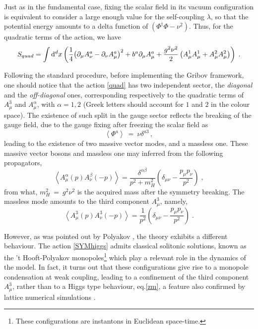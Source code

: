 Just as in the fundamental case, fixing the scalar field in its vacuum configuration is
equivalent to consider a large enough value for the self-coupling $\lambda$, so that the
potential energy amounts to a delta function of $\left(\Phi ^{\dagger}\Phi-\nu ^{2}\right)$.
Thus, for the quadratic terms of the action, we have
\begin{equation}
S_{quad}=\int \mathrm{d}^{d}x\left( \frac{1}{4} { \left(  \partial_\mu A^a_\nu -\partial_\nu A^a_\mu  \right)} ^2 + b^a \partial_\mu A^a_\mu
+ \frac{g^{2}\nu ^{2}}{2}\left( A_{\mu }^{1}A_{\mu }^{1}+A_{\mu }^{2}A_{\mu
}^{2}\right)  \right)  \;. 
\label{quad}
\end{equation}


Following the standard procedure, before implementing the Gribov framework, one should notice
that the action \eqref{quad} has two independent sector, the \emph{diagonal} and the
\emph{off-diagonal} ones, corresponding respectively to the quadratic terms of $A_{\mu}^{3}$
and $A_{\mu}^{\alpha}$, with $\alpha=1,2$ (Greek letters should account for $1$ and $2$ in the
colour space). The existence of such split in the gauge sector reflects the breaking of the
gauge field, due to the gauge fixing after freezing the scalar field as 
\[
\left\langle \Phi^{a}\right\rangle ~=~ \nu \delta ^{a3}\,,
\]
leading to the existence of two massive vector modes, and a massless one. These massive vector
bosons and massless one may inferred from the following propagators,
\begin{equation}
\label{gluonoff}
\left\langle A_{\mu }^{\alpha }(p)A_{\nu }^{\beta }(-p)\right\rangle =\frac{\delta ^{\alpha \beta }}{p^{2}+m_{H}^{2}}\left( \delta _{\mu \nu }-%
\frac{p_{\mu }p_{\nu }}{p^{2}}\right) \;,
\end{equation}
from what, $m_{H}^{2} ~=~ g^{2}\nu ^{2}$ is the acquired mass after the symmetry breaking. The
massless mode amounts to the third component $A_\mu^3$, namely,
\begin{equation}
\left\langle A_{\mu }^{3}(p)A_{\nu }^{3}(-p)\right\rangle =\frac{1}{p^{2}}%
\left( \delta _{\mu \nu }-\frac{p_{\mu }p_{\nu }}{p^{2}}\right) \;. 
\label{zm}
\end{equation}

However, as was pointed out by Polyakov  \cite{Polyakov:1976fu}, the theory exhibits a different behaviour. The action \eqref{SYMhiggs} admits classical solitonic solutions, known as the 't Hooft-Polyakov monopoles\footnote{ These configurations are instantons in Euclidean space-time.} which play a relevant role in the dynamics of the model. In fact, it turns out that these configurations give rise to a monopole condensation at weak coupling, leading to a confinement of the third component $A^3_\mu$, rather than to a Higgs type behaviour, eq.\eqref{zm}, a feature also confirmed by lattice numerical simulations  \cite{Nadkarni:1989na,Hart:1996ac}.


